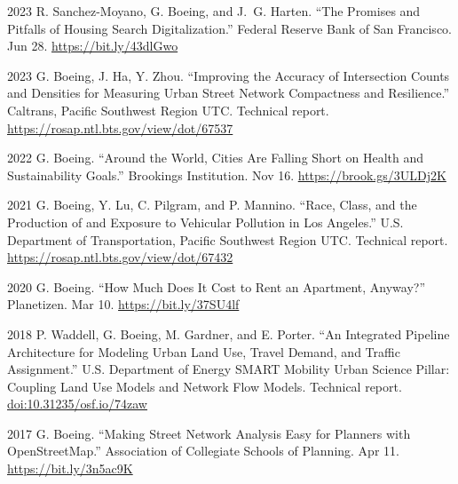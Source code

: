 \documentclass[11pt,letterpaper]{report} %
\begin{document}
    \begin{tablist}

        \item[2023] \tab{}R. Sanchez-Moyano, G. Boeing, and J.~G. Harten. \enquote{The Promises and Pitfalls of Housing Search Digitalization.} Federal Reserve Bank of San Francisco. Jun 28. \href{https://bit.ly/43dlGwo}{https://bit.ly/43dlGwo}

        \item[2023] \tab{}G. Boeing, J. Ha, Y. Zhou. \enquote{Improving the Accuracy of Intersection Counts and Densities for Measuring Urban Street Network Compactness and Resilience.} Caltrans, Pacific Southwest Region UTC\@. Technical report. \href{https://rosap.ntl.bts.gov/view/dot/67537}{https://rosap.ntl.bts.gov/view/dot/67537}

        \item[2022] \tab{}G. Boeing. \enquote{Around the World, Cities Are Falling Short on Health and Sustainability Goals.} Brookings Institution. Nov 16. \href{https://brook.gs/3ULDj2K}{https://brook.gs/3ULDj2K}

        \item[2021] \tab{}G. Boeing, Y. Lu, C. Pilgram, and P. Mannino. \enquote{Race, Class, and the Production of and Exposure to Vehicular Pollution in Los Angeles.} U.S. Department of Transportation, Pacific Southwest Region UTC\@. Technical report. \href{https://rosap.ntl.bts.gov/view/dot/67432}{https://rosap.ntl.bts.gov/view/dot/67432}

        \item[2020] \tab{}G. Boeing. \enquote{How Much Does It Cost to Rent an Apartment, Anyway?} Planetizen. Mar 10. \href{https://bit.ly/37SU4lf}{https://bit.ly/37SU4lf}

        \item[2018] \tab{}P. Waddell, G. Boeing, M. Gardner, and E. Porter. \enquote{An Integrated Pipeline Architecture for Modeling Urban Land Use, Travel Demand, and Traffic Assignment.} U.S. Department of Energy SMART Mobility Urban Science Pillar: Coupling Land Use Models and Network Flow Models. Technical report. \href{https://doi.org/10.31235/osf.io/74zaw}{doi:10.31235/osf.io/74zaw}

        \item[2017] \tab{}G. Boeing. \enquote{Making Street Network Analysis Easy for Planners with OpenStreetMap.} Association of Collegiate Schools of Planning. Apr 11. \href{https://bit.ly/3n5ac9K}{https://bit.ly/3n5ac9K}

    \end{tablist}
\end{document}
